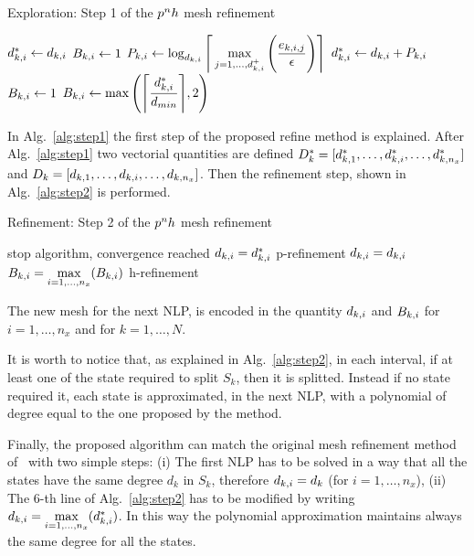 


\begin{algorithm}
\caption{Exploration: Step 1 of the $p^{n}h$ mesh refinement}\label{alg:step1}
	\begin{algorithmic}[1]
				\State $d_{k,i}^{*} \gets d_{k,i}$
				\State $B_{k,i} \gets 1$  %
			\Else
				\State $P_{k,i} \gets \log_{d_{k,i}} \Bigg\lceil \max\limits_{j= 1, \dots, d_{k,i}^{+}} \Bigg(\dfrac{e_{k,i,j}}{\epsilon}\Bigg) \Bigg\rceil$
				\State $d_{k,i}^{*} \gets d_{k,i} + P_{k,i}$
						\State $B_{k,i} \gets 1$		
					\Else
						\State $B_{k,i} \gets \max\Bigg(\Bigg\lceil \dfrac{d_{k,i}^{*}}{d_{min}}\Bigg\rceil, 2\Bigg)$
					\EndIf
			\EndIf
		\EndFor
	\end{algorithmic}
\end{algorithm}

In Alg.~\ref{alg:step1} the first step of the proposed refine method is explained. After Alg.~\ref{alg:step1} two vectorial quantities are defined $D_{k}^{*} = [d_{k,1}^{*}, \dots, d_{k,i}^{*}, \dots, d_{k,n_x}^{*}]$ and $D_{k} = [d_{k,1}, \dots, d_{k,i}, \dots, d_{k,n_x}]$. Then the refinement step, shown in Alg.~\ref{alg:step2} is performed.

\begin{algorithm}
	\caption{Refinement: Step 2 of the $p^{n}h$ mesh refinement}\label{alg:step2}
	\begin{algorithmic}[1]
			\If {$\Dks = \Dk$}
				\State stop algorithm, convergence reached	
			\Else
					\State $d_{k,i} = d_{k,i}^{*}$ \Comment p-refinement
				\EndFor
			\EndIf
		\Else
				\State $d_{k,i} = d_{k,i}$
				\State $B_{k,i} = \max\limits_{i= 1, \dots, n_x}(B_{k,i})$ \Comment h-refinement
			\EndFor		
		\EndIf
	\end{algorithmic}
\end{algorithm}


The new mesh for the next NLP, is encoded in the quantity $d_{k,i}$ and $B_{k,i}$ for $i = 1, \dots, n_x$ and for $k = 1, \dots, N$.

It is worth to notice that, as explained in Alg.~\ref{alg:step2}, in each interval, if at least one of the state required to split $S_k$, then it is splitted. Instead if no state required it, each state is approximated, in the next NLP, with a polynomial of degree equal to the one proposed by the method.

Finally, the proposed algorithm can match the original mesh refinement method of~\cite{Patterson:OCAM:2015} with two simple steps: (i) The first NLP has to be solved in a way that all the states have the same degree $d_k$ in $S_k$, therefore $d_{k,i} = d_k$ (for $i = 1, \dots, n_x$), (ii) The $6$-th line of Alg.~\ref{alg:step2} has to be modified by writing $d_{k,i} = \max\limits_{i= 1, \dots, n_x}(d_{k,i}^{*})$. In this way the polynomial approximation maintains always the same degree for all the states.



